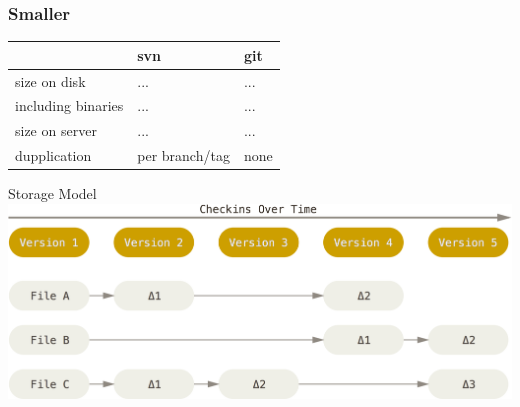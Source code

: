 \begin{frame}
\frametitle{Smaller}
\begin{block}{}
		\begin{tabular}{l | l | l}
			 & svn & git \\
			\hline
			size on disk & ... & ... \\
			including binaries & ... & ... \\
			size on server & ... & ... \\
			dupplication & per branch/tag & none \\
		\end{tabular}
	\end{block}
\end{frame}

\begin{frame}
	\begin{block}{Storage Model}
		\includegraphics[width=\textwidth]{./images/deltaStorage.png}
	\end{block}
\end{frame}
